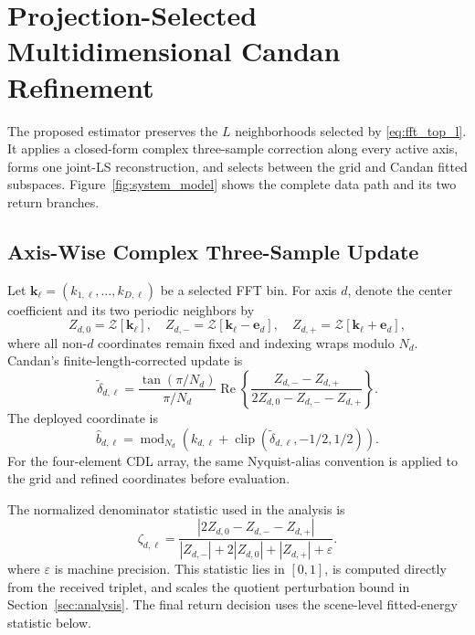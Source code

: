\section{Projection-Selected Multidimensional Candan Refinement}

The proposed estimator preserves the $L$ neighborhoods selected by \eqref{eq:fft_top_l}. It applies a closed-form complex three-sample correction along every active axis, forms one joint-LS reconstruction, and selects between the grid and Candan fitted subspaces. Figure~\ref{fig:system_model} shows the complete data path and its two return branches.

\subsection{Axis-Wise Complex Three-Sample Update}

Let $\mathbf{k}_\ell=(k_{1,\ell},\ldots,k_{D,\ell})$ be a selected FFT bin. For axis $d$, denote the center coefficient and its two periodic neighbors by
\begin{equation}
 Z_{d,0}=\mathcal{Z}[\mathbf{k}_\ell],\quad
 Z_{d,-}=\mathcal{Z}[\mathbf{k}_\ell-\mathbf{e}_d],\quad
 Z_{d,+}=\mathcal{Z}[\mathbf{k}_\ell+\mathbf{e}_d],
 \label{eq:candan_triplet}
\end{equation}
where all non-$d$ coordinates remain fixed and indexing wraps modulo $N_d$. Candan's finite-length-corrected update is
\begin{equation}
 \widetilde{\delta}_{d,\ell}=
 \frac{\tan(\pi/N_d)}{\pi/N_d}
 \operatorname{Re}\!\left\{
 \frac{Z_{d,-}-Z_{d,+}}
 {2Z_{d,0}-Z_{d,-}-Z_{d,+}}
 \right\}.
 \label{eq:candan_update}
\end{equation}
The deployed coordinate is
\begin{equation}
 \widehat b_{d,\ell}=
 \operatorname{mod}_{N_d}\!\left(
 k_{d,\ell}+\operatorname{clip}(\widetilde{\delta}_{d,\ell},-1/2,1/2)
 \right).
 \label{eq:candan_clip}
\end{equation}
For the four-element CDL array, the same Nyquist-alias convention is applied to the grid and refined coordinates before evaluation.

The normalized denominator statistic used in the analysis is
\begin{equation}
 \zeta_{d,\ell}=
 \frac{|2Z_{d,0}-Z_{d,-}-Z_{d,+}|}
 {|Z_{d,-}|+2|Z_{d,0}|+|Z_{d,+}|+\varepsilon}.
 \label{eq:candan_stability}
\end{equation}
where $\varepsilon$ is machine precision. This statistic lies in $[0,1]$, is computed directly from the received triplet, and scales the quotient perturbation bound in Section~\ref{sec:analysis}. The final return decision uses the scene-level fitted-energy statistic below.


